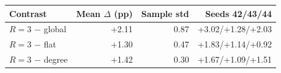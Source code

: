 \begin{tabular}{lrrr}
\toprule
Contrast & Mean $\Delta$ (pp) & Sample std & Seeds 42/43/44 \\
\midrule
$R=3$ $-$ global & +2.11 & 0.87 & +3.02/+1.28/+2.03 \\
$R=3$ $-$ flat & +1.30 & 0.47 & +1.83/+1.14/+0.92 \\
$R=3$ $-$ degree & +1.42 & 0.30 & +1.67/+1.09/+1.51 \\
\bottomrule
\end{tabular}
